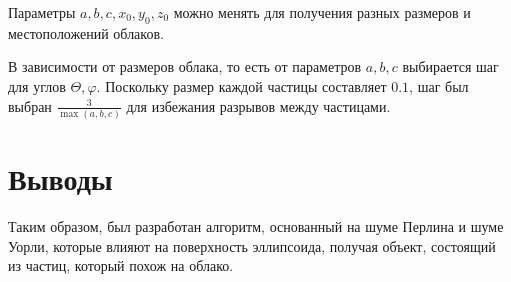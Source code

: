 Параметры $a,b,c,x_0,y_0,z_0$ можно менять для получения разных размеров и местоположений облаков.

В зависимости от размеров облака, то есть от параметров $a, b, c$ выбирается шаг для углов $\Theta, \varphi$.
Поскольку размер каждой частицы составляет $0.1$, шаг был выбран $\frac{3}{\max(a,b,c)}$ для избежания
разрывов между частицами.

\section{Выводы}

Таким образом, был разработан алгоритм, основанный на шуме Перлина и шуме Уорли, которые влияют
на поверхность эллипсоида, получая объект, состоящий из частиц, который похож на облако.
